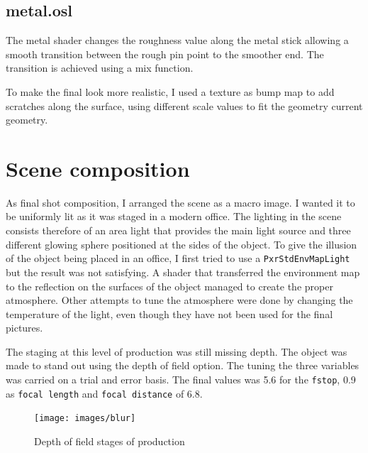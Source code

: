 \documentclass[tog]{acmsiggraph}
\begin{document}
\vspace{1.0cm}
\subsection{metal.osl}

The metal shader changes the roughness value along the metal stick allowing a smooth transition between the rough pin point to the smoother end. The transition is achieved using a mix function.

To make the final look more realistic, I used a texture as bump map to add scratches along the surface, using different scale values to fit the geometry current geometry.

\section{Scene composition}

As final shot composition, I arranged the scene as a macro image. I wanted it to be uniformly lit as it was staged in a modern office. The lighting in the scene consists therefore of an area light that provides the main light source and three different glowing sphere positioned at the sides of the object. To give the illusion of the object being placed in an office, I first tried to use a \texttt{PxrStdEnvMapLight} but the result was not satisfying. A shader that transferred the environment map to the reflection on the surfaces of the object managed to create the proper atmosphere. Other attempts to tune the atmosphere were done by changing the temperature of the light, even though they have not been used for the final pictures.

The staging at this level of production was still missing depth. The object was made to stand out using the depth of field option. The tuning the three variables was carried on a trial and error basis. The final values was 5.6 for the \texttt{fstop}, 0.9 as \texttt{focal length} and \texttt{focal distance} of 6.8.

\begin{figure}[ht]
  \centering
  \texttt{[image: images/blur]}
  \caption{Depth of field stages of production}
  \label{fig:blur}
\end{figure}
\end{document}
